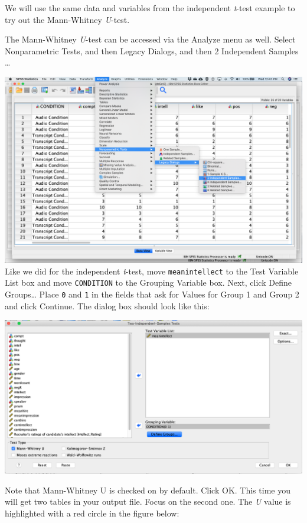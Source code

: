 \documentclass[
]{book}
\begin{document}
We will use the same data and variables from the independent \emph{t}-test example to try out the Mann-Whitney \emph{U}-test.

The Mann-Whitney \emph{U}-test can be accessed via the {Analyze} menu as well. Select { Nonparametric Tests}, and then {Legacy Dialogs}, and then {2 Independent Samples \ldots{}}

\includegraphics{img/12.2.8.png}
Like we did for the independent \emph{t}-test, move \texttt{meanintellect} to the {Test Variable List} box and move \texttt{CONDITION} to the {Grouping Variable} box. Next, click {Define Groups\ldots{}} Place \texttt{0} and \texttt{1} in the fields that ask for Values for Group 1 and Group 2 and click {Continue}. The dialog box should look like this:

\includegraphics{img/12.2.9.png}

Note that {Mann-Whitney U} is checked on by default. Click {OK}. This time you will get two tables in your output file. Focus on the second one. The \emph{U} value is highlighted with a red circle in the figure below:
\end{document}
